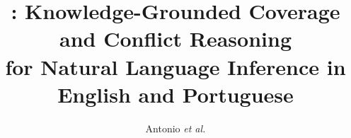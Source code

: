 \documentclass[11pt]{article}
\title{\model: Knowledge-Grounded Coverage and Conflict Reasoning\\for Natural Language Inference in English and Portuguese}
\author{Antonio \textit{et al.} \\
  \todo{affiliation} \\
  \texttt{\todo{email}}}
\begin{document}
\maketitle

\begin{abstract}
\end{abstract}









\end{document}
